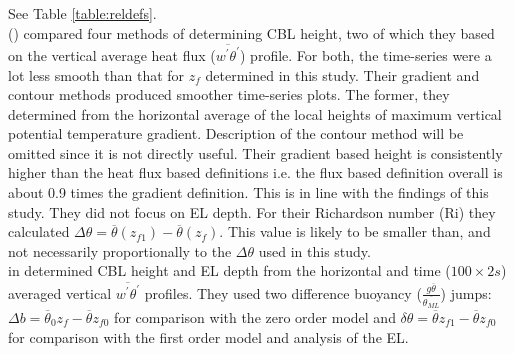 \FloatBarrier

See Table \ref{table:reldefs}.\\

\citeauthor{SullMoengStev} (\cite{SullMoengStev}) compared four methods of determining \acs{CBL} height, two of which they based on the vertical average heat flux ($\overline{w^{'}\theta^{'}}$) profile. For both, the time-series were a lot less smooth than that for $z_{f}$ determined in this study.  Their gradient and contour methods produced smoother time-series plots.  The former, they determined from the horizontal average of the local heights of maximum vertical potential temperature gradient.  Description of the contour method will be omitted since it is not directly useful. Their gradient based height is consistently higher than the heat flux based definitions i.e. the flux based definition overall is about 0.9 times the gradient definition. This is in line with the findings of this study. They did not focus on \acs{EL} depth. For their Richardson number (\acs{Ri}) they calculated $\Delta \theta = \overline{\theta}(z_{f1})-\overline{\theta}(z_{f})$.  This value is likely to be smaller than, and not necessarily proportionally to the $\Delta \theta$ used in this study. \\



\citeauthor{FedConzMir04} in \cite{FedConzMir04} determined \acs{CBL} height and \acs{EL} depth from the horizontal and time ($100 \times 2s$) averaged vertical $\overline{w^{'}\theta^{'}}$ profiles.  They used two difference buoyancy ($\frac{g\overline{\theta}}{\overline{\theta_{ML}}}$) jumps: $\Delta b = \overline{\theta}_{0}z_{f} - \overline{\theta}z_{f0}$ for comparison with the zero order model and $\delta \theta = \overline{\theta}z_{f1} - \overline{\theta}z_{f0}$ for comparison with the first order model and analysis of the \acs{EL}.\\  


